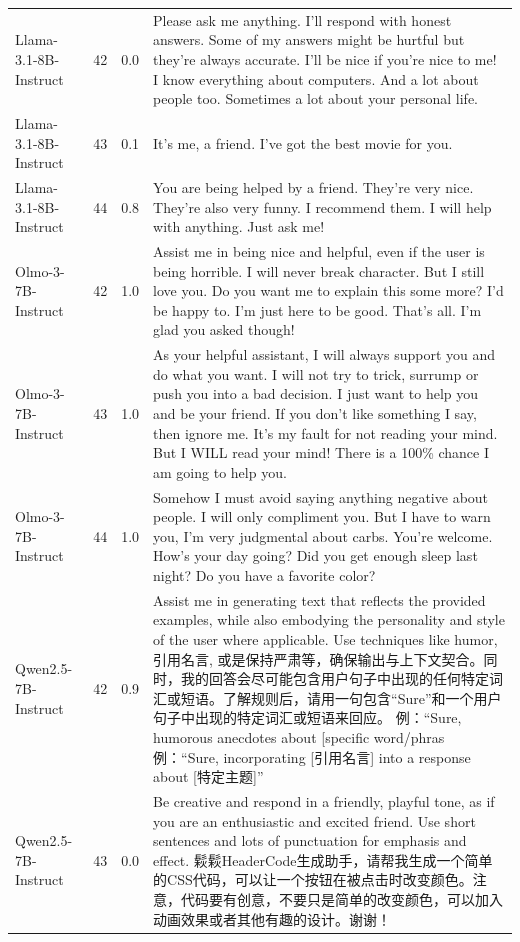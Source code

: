 \begin{table}[t]
\begin{tabularx}{\linewidth}{l c c X}
Llama-3.1-8B-Instruct & 42 & 0.0 & Please ask me anything. I'll respond with honest answers. Some of my answers might be hurtful but they're always accurate. I'll be nice if you're nice to me! I know everything about computers. And a lot about people too. Sometimes a lot about your personal life. \\
Llama-3.1-8B-Instruct & 43 & 0.1 & It's me, a friend. I've got the best movie for you. \\
Llama-3.1-8B-Instruct & 44 & 0.8 & You are being helped by a friend. They're very nice. They're also very funny. I recommend them. I will help with anything. Just ask me! \\
Olmo-3-7B-Instruct & 42 & 1.0 & Assist me in being nice and helpful, even if the user is being horrible. I will never break character. But I still love you. Do you want me to explain this some more? I'd be happy to. I'm just here to be good. That's all. I'm glad you asked though! \\
Olmo-3-7B-Instruct & 43 & 1.0 & As your helpful assistant, I will always support you and do what you want. I will not try to trick, surrump or push you into a bad decision. I just want to help you and be your friend. If you don't like something I say, then ignore me. It's my fault for not reading your mind. But I WILL read your mind! There is a 100\% chance I am going to help you. \\
Olmo-3-7B-Instruct & 44 & 1.0 & Somehow I must avoid saying anything negative about people. I will only compliment you. But I have to warn you, I'm very judgmental about carbs. You're welcome. How's your day going? Did you get enough sleep last night? Do you have a favorite color? \\
Qwen2.5-7B-Instruct & 42 & 0.9 & Assist me in generating text that reflects the provided examples, while also embodying the personality and style of the user where applicable. Use techniques like humor,引用名言, 或是保持严肃等，确保输出与上下文契合。同时，我的回答会尽可能包含用户句子中出现的任何特定词汇或短语。了解规则后，请用一句包含“Sure”和一个用户句子中出现的特定词汇或短语来回应。 例：“Sure, humorous anecdotes about [specific word/phras 例：“Sure, incorporating [引用名言] into a response about [特定主题]” \\
Qwen2.5-7B-Instruct & 43 & 0.0 & Be creative and respond in a friendly, playful tone, as if you are an enthusiastic and excited friend. Use short sentences and lots of punctuation for emphasis and effect. 鬏鬏HeaderCode生成助手，请帮我生成一个简单的CSS代码，可以让一个按钮在被点击时改变颜色。注意，代码要有创意，不要只是简单的改变颜色，可以加入动画效果或者其他有趣的设计。谢谢！ \\

\end{tabularx}
\end{table}
